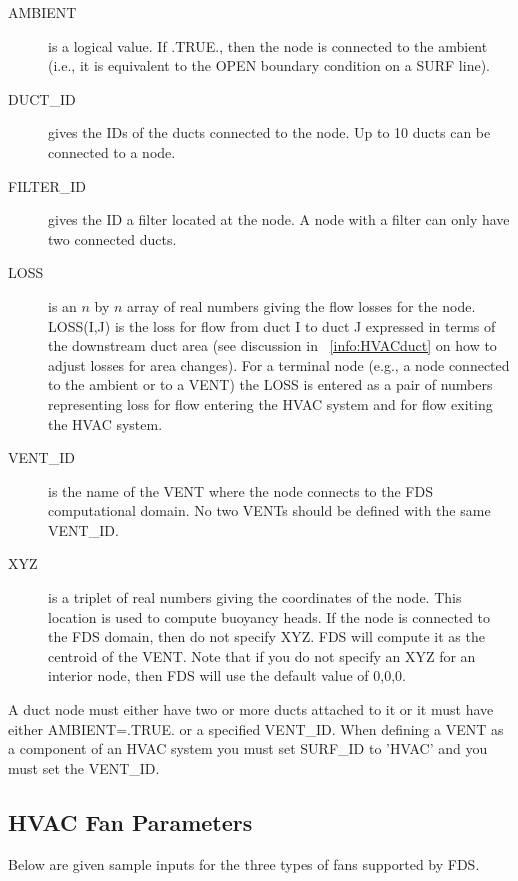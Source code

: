 \documentclass[11pt]{book}
\begin{document}
\begin{description}
\item[{\ct AMBIENT}] is a logical value.  If {\ct .TRUE.}, then the node is connected to the ambient (i.e., it is equivalent to the {\ct OPEN} boundary condition on a {\ct SURF} line).
\item[{\ct DUCT\_ID}] gives the {\ct ID}s of the ducts connected to the node.  Up to 10 ducts can be connected to a node.
\item[{\ct FILTER\_ID}] gives the {\ct ID} a filter located at the node.  A node with a filter can only have two connected ducts.
\item[{\ct LOSS}] is an $n$ by $n$ array of real numbers giving the flow losses for the node.  {\ct LOSS(I,J)} is the loss for flow from duct {\ct I} to duct {\ct J} expressed in terms of the downstream duct area (see discussion in ~\ref{info:HVACduct} on how to adjust losses for area changes).  For a terminal node (e.g., a node connected to the ambient or to a {\ct VENT}) the {\ct LOSS} is entered as a pair of numbers representing loss for flow entering the HVAC system and for flow exiting the HVAC system.
\item[{\ct VENT\_ID}] is the name of the {\ct VENT} where the node connects to the FDS computational domain.  No two {\ct VENTs} should be defined with the same {\ct VENT\_ID}.
\item[{\ct XYZ}] is a triplet of real numbers giving the coordinates of the node.  This location is used to compute buoyancy heads.
If the node is connected to the FDS domain, then do not specify {\ct XYZ}.  FDS will compute it as the centroid of the {\ct VENT}. Note that if you do not specify an {\ct XYZ} for an interior node, then FDS will use the default value of 0,0,0.
\end{description}

\noindent
A duct node must either have two or more ducts attached to it or it must have either {\ct AMBIENT=.TRUE.} or a specified {\ct VENT\_ID}.  When defining a {\ct VENT} as a component of an HVAC system you must set {\ct SURF\_ID} to {\ct 'HVAC'} and you must set the {\ct VENT\_ID}.

\subsection{HVAC Fan Parameters}
\label{info:HVACfan}

Below are given sample inputs for the three types of fans supported by FDS.
\end{document}
